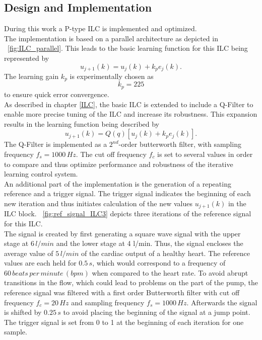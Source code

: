 \subsection{Design and Implementation}
During this work a P-type ILC is implemented and optimized.
\\The implementation is based on a parallel architecture as depicted in \figurename~\ref{fig:ILC_parallel}. This leads to the basic learning function for this ILC being represented by
\begin{equation}
  u_{j+1}(k) = u_{j}(k)+k_{p}e_{j}(k).
\end{equation}
The learning gain $k_p$ is experimentally chosen as
\begin{equation}
  k_p = 225
\end{equation}
to ensure quick error convergence.
\\As described in chapter \ref{ILC}, the basic ILC is extended to include a Q-Filter to enable more precise tuning of the ILC and increase its robustness.
This expansion results in the learning function being described by
\begin{equation}
  u_{j+1}(k) = Q(q)[u_{j}(k)+k_{p}e_{j}(k)].
\end{equation}
The Q-Filter is implemented as a $2^{nd}$-order butterworth filter, with sampling frequency $f_s=1000\,Hz$. The cut off frequency $f_c$ is set to several values in order to compare and thus optimize performance and robustness of the iterative learning control system.
\\An additional part of the implementation is the generation of a repeating reference and a trigger signal. The trigger signal indicates the beginning of each new iteration and thus initiates calculation of the new values $u_{j+1}(k)$ in the ILC block.
\figurename~\ref{fig:ref_signal_ILC3} depicts three iterations of the reference signal for this ILC.
\\The signal is created by first generating a square wave signal with the upper stage at $6\, l/min$ and the lower stage at 4 l/min. Thus, the signal encloses the average value of $5\, l/min$ of the cardiac output of a healthy heart. The reference values are each held for $0.5\, s$, which would correspond to a frequency of $60\, beats\, per\, minute\, (bpm)$ when compared to the heart rate. To avoid abrupt transitions in the flow, which could lead to problems on the part of the pump, the reference signal was filtered with a first order Butterworth filter with cut off frequency $f_c=20\,Hz$ and sampling frequency $f_s=1000\,Hz$. Afterwards the signal is shifted by $0.25\, s$ to avoid placing the beginning of the signal at a jump point. The trigger signal is set from 0 to 1 at the beginning of each iteration for one sample. 

